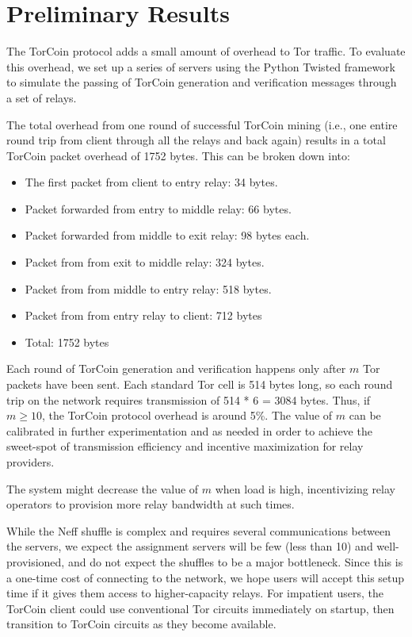 \section{Preliminary Results}

The TorCoin protocol adds a small amount of overhead to Tor traffic. 
To evaluate this overhead,
we set up a series of servers using the Python Twisted
framework\cite{twisted} to simulate the passing of TorCoin generation and
verification messages through a set of relays.

The total overhead from one round of successful TorCoin mining (i.e., one entire
round trip from client through all the relays and back again) results in a total
TorCoin packet overhead of 1752 bytes. This can be broken down into:

\begin{itemize}
	\item The first packet from client to entry relay: 34 bytes.
	\item Packet forwarded from entry to middle relay: 66 bytes.
	\item Packet forwarded from middle to exit relay: 98 bytes each.
	\item Packet from from exit to middle relay: 324 bytes.
	\item Packet from from middle to entry relay: 518 bytes.
	\item Packet from from entry relay to client: 712 bytes
	\item Total: 1752 bytes
\end{itemize}



Each round of TorCoin generation and verification happens only after $m$ Tor
packets have been sent. Each standard Tor cell is 514 bytes long, so each
round trip on the network requires transmission of 514 * 6 = 3084 bytes. Thus,
if $m \geq 10$, the TorCoin protocol overhead is around 5\%. The value of $m$
can be calibrated in further experimentation and as needed in order to achieve
the sweet-spot of transmission efficiency and incentive maximization for relay
providers.

The system might decrease the value of $m$ when load is high,
incentivizing relay operators
to provision more relay bandwidth at such times.

While the Neff shuffle is complex and requires several
communications between the servers,
we expect the assignment servers will be few (less than 10)
and well-provisioned,
and do not expect the shuffles to be a major bottleneck.
Since this is a one-time cost of connecting to the network,
we hope users will accept this setup time
if it gives them access to higher-capacity relays.
For impatient users,
the TorCoin client could use conventional Tor circuits immediately on startup,
then transition to TorCoin circuits as they become available.

